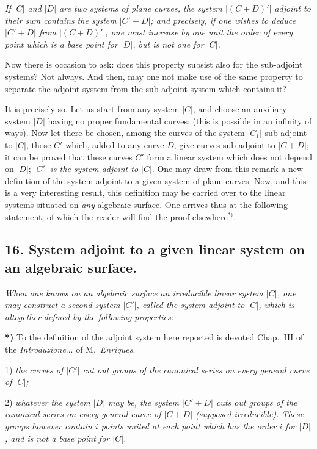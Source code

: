 \documentclass{article}
\begin{document}
\emph{If $|C|$ and $|D|$ are two systems of plane curves, the system $|(C + D)'|$ adjoint to their sum contains the system $|C' + D|$; and precisely, if one wishes to deduce $|C' + D|$ from $|(C + D)'|$, one must increase by one unit the order of every point which is a base point for $|D|$, but is not one for $|C|$.}

Now there is occasion to ask: does this property subsist also for the sub-adjoint systems? Not always. And then, may one not make use of the same property to separate the adjoint system from the sub-adjoint system which contains it?

It is precisely so. Let us start from any system $|C|$, and choose an auxiliary system $|D|$ having no proper fundamental curves; (this is possible in an infinity of ways). Now let there be chosen, among the curves of the system $|C_{1}|$ sub-adjoint to $|C|$, those $C'$ which, added to any curve $D$, give curves sub-adjoint to $|C + D|$; it can be proved that these curves $C'$ form a linear system which does not depend on $|D|$; \emph{$|C'|$ is the system adjoint to $|C|$}. One may draw from this remark a new definition of the system adjoint to a given system of plane curves. Now, and this is a very interesting result, this definition may be carried over to the linear systems situated on \emph{any} algebraic surface. One arrives thus at the following statement, of which the reader will find the proof elsewhere${}^{*)}$.

\subsection*{16. System adjoint to a given linear system on an algebraic surface.}

\emph{When one knows on an algebraic surface an irreducible linear system $|C|$, one may construct a second system $|C'|$, called the system adjoint to $|C|$, which is altogether defined by the following properties:}

\textbf{*)} To the definition of the adjoint system here reported is devoted Chap.\ III of the \emph{Introduzione}... of M.\ \emph{Enriques}.


1) \emph{the curves of $|C'|$ cut out groups of the canonical series on every general curve of $|C|$;}

2) \emph{whatever the system $|D|$ may be, the system $|C' + D|$ cuts out groups of the canonical series on every general curve of $|C + D|$ (supposed irreducible). These groups however contain $i$ points united at each point which has the order $i$ for $|D|$, and is not a base point for $|C|$.}
\end{document}
